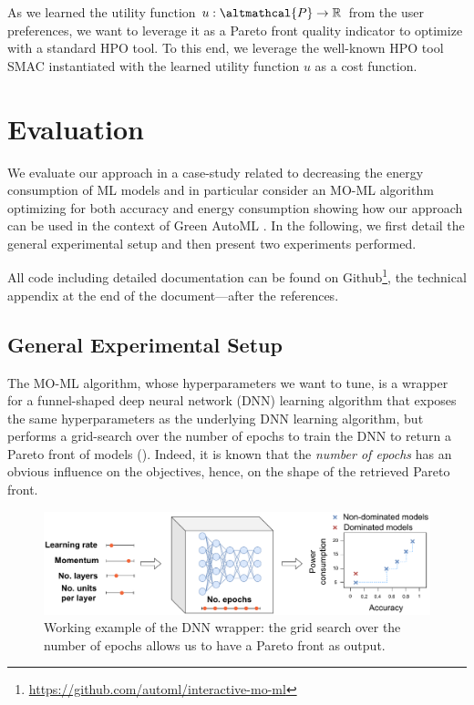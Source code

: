 As we learned the utility function $u: \altmathcal{P} \rightarrow \mathbb{R}$ from the user preferences, we want to leverage it as a Pareto front quality indicator to optimize with a standard HPO tool. To this end, we leverage the well-known HPO tool SMAC \cite{hutter-lion11a,lindauer-jmlr22a} instantiated with the learned utility function $u$ as a cost function. 
\section{Evaluation}
\label{moo-sec:evaluation}

We evaluate our approach in a case-study related to decreasing the energy consumption of ML models and in particular consider an MO-ML algorithm optimizing for both accuracy and energy consumption showing how our approach can be used in the context of Green AutoML \cite{tornede-jair23a}. In the following, we first detail the general experimental setup and then present two experiments performed.

All code including detailed documentation can be found on Github\footnote{\url{https://github.com/automl/interactive-mo-ml}}, the technical appendix at the end of the document---after the references.

\subsection{General Experimental Setup}
\label{moo-ssec:experimental_setup}

The MO-ML algorithm, whose hyperparameters we want to tune, is a wrapper for a funnel-shaped deep neural network (DNN) learning algorithm that exposes the same hyperparameters as the underlying DNN learning algorithm, but performs a grid-search over the number of epochs to train the DNN to return a Pareto front of models ().
Indeed, it is known that the \textit{number of epochs} has an obvious influence on the objectives, hence, on the shape of the retrieved Pareto front.

\begin{figure}[h]
    \centering
    \includegraphics[width=0.8\columnwidth]{chapters/human-centric/moo/img/grid_search.pdf}
    \caption{Working example of the DNN wrapper: the grid search over the number of epochs allows us to have a Pareto front as output.}
    \label{moo-fig:grid_search}
\end{figure}


